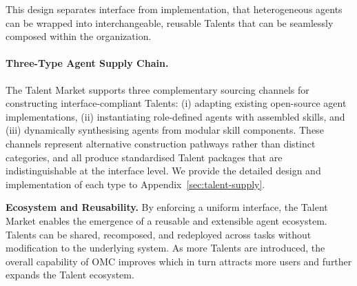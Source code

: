 This design separates interface from implementation, that heterogeneous agents can be wrapped into interchangeable, reusable Talents that can be seamlessly composed within the organization.

\paragraph{Three-Type Agent Supply Chain.}
The Talent Market supports three complementary sourcing channels for constructing interface-compliant Talents: (i) adapting existing open-source agent implementations, (ii) instantiating role-defined agents with assembled skills, and (iii) dynamically synthesising agents from modular skill components. These channels represent alternative construction pathways rather than distinct categories, and all produce standardised Talent packages that are indistinguishable at the interface level. We provide the detailed design and implementation of each type to Appendix~\ref{sec:talent-supply}.

\textbf{Ecosystem and Reusability.}
By enforcing a uniform interface, the Talent Market enables the emergence of a reusable and extensible agent ecosystem. Talents can be shared, recomposed, and redeployed across tasks without modification to the underlying system. As more Talents are introduced, the overall capability of OMC improves which in turn attracts more users and further expands the Talent ecosystem.













